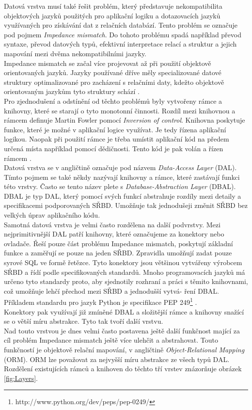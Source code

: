 \documentclass[ing,male,java,dept456]{diploma}						%
\begin{document}
Datová vrstva musí také řešit problém, který představuje nekompatibilita objektových jazyků použitých pro aplikační logiku a dotazovacích jazyků využívaných pro získávání dat z relačních databází. Tento problém se označuje pod pojmem \textit{Impedance mismatch}. Do tohoto problému spadá například převod syntaxe, převod datových typů, efektivní interpretace relací a struktur a jejich mapování mezi dvěma nekompatibilními jazyky. \\
Impedance mismatch se začal více projevovat až při použití objektově orientovaných jazyků. Jazyky používané dříve měly specializované datové struktury optimalizované pro zacházení s relačními daty, kdežto objektově orientovaným jazykům tyto struktury schází \cite{dbprogrammer}. \\

Pro zjednodušení a odstínění od těchto problémů byly vytvořeny rámce a knihovny, které se starají o tyto monotonní činnosti. Rozdíl mezi knihovnou a rámcem definuje Martin Fowler pomocí \textit{Inversion of control}. Knihovna poskytuje funkce, které je možné v aplikační logice využívat. Je tedy řízena aplikační logikou. Naopak při použití rámce je třeba umístit aplikační kód na předem určená místa například pomocí dědičnosti. Tento kód je pak volán a řízen rámcem \cite{fowler-ioc}.  \\

Datová vrstva se v angličtině označuje pod názvem \textit{Data-Access Layer} (DAL). Tímto pojmem se také někdy nazývají knihovny a rámce, které zastávají funkci této vrstvy. Často se tento název plete s \textit{Database-Abstraction Layer} (DBAL). DBAL je typ DAL, který pomocí svých funkcí abstrahuje rozdíly mezi detaily a specifikacemi podporovaných SŘBD. Umožňuje tak jednodušeji změnit SŘBD bez velkých úprav aplikačního kódu. \\

Samotná datová vrstva je velmi často rozdělena na další podvrstvy. Mezi nejprimitivnější DAL patří knihovny, které označujeme za konektory nebo ovladače. Řeší pouze část problému Impedance mismatch, poskytují základní funkce a zaměřují se pouze na jeden SŘBD. Zpravidla umožňují zadat pouze syrové SQL ve formě řetězce. Tyto konektory jsou většinou vytvářeny výrobcem SŘBD a řídí podle specifikovaných standardů. Mnoho programovacích jazyků má určeno tyto standardy proto, aby sjednotily rozhraní a práci s těmito knihovnami, což umožňuje lehčí přechod mezi SŘBD a jednodušší vytvá- ření DBAL. Příkladem standardu pro jazyk Python je specifikace PEP 249\footnote{http://www.python.org/dev/peps/pep-0249/} .\\
Konektory pak využívají již zmíněné DBAL a složitější rámce a knihovny snažící se o větší míru abstrakce. Tyto tak tvoří další vrstvu. \\
Nad touto vrstvou je dnes velmi často postavena ještě další funkčnost mající za cíl problém Impedance mismatch ještě více ulehčit a abstrahovat. Touto funkčností je objektově relační mapování, v angličtině \textit{Object-Relational Mapping} (ORM). ORM lze považovat za nejvyšší míru abstrakce ze všech typů DAL.  \\
Rozdělení existujících rámců a knihoven do těchto tří vrstev znázorňuje obrázek \ref{fig:Layers}.
\end{document}
